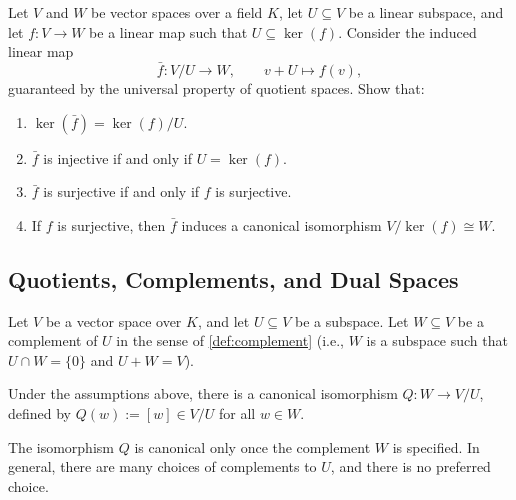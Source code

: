 \begin{exercise}
\label{exc:properties_induced_quotient_maps}
Let $V$ and $W$ be vector spaces over a field $K$, let $U \subseteq V$ be a linear subspace, and let $f \colon V \to W$ be a linear map such that $U \subseteq \ker(f)$. Consider the induced linear map
\[
\bar{f} \colon V/U \longrightarrow W, \qquad v + U \longmapsto f(v),
\]
guaranteed by the universal property of quotient spaces. Show that:
\begin{enumerate}
    \item $\ker(\bar{f}) = \ker(f)/U$.
    \item $\bar{f}$ is injective if and only if $U = \ker(f)$.
    \item $\bar{f}$ is surjective if and only if $f$ is surjective.
    \item If $f$ is surjective, then $\bar{f}$ induces a canonical isomorphism $V/\ker(f) \cong W$.
\end{enumerate}
\end{exercise}

\subsection{Quotients, Complements, and Dual Spaces}

Let $V$ be a vector space over $K$, and let $U \subseteq V$ be a subspace. Let $W \subseteq V$ be a complement of $U$ in the sense of \cref{def:complement} (i.e., $W$ is a subspace such that $U \cap W = \{0\}$ and $U + W = V$).

\begin{proposition}
  \label{prop:iso_complement}
  Under the assumptions above, there is a canonical isomorphism $Q \colon W \to V/U$, defined by $Q(w) := [w] \in V/U$ for all $w \in W$.
\end{proposition}

\begin{remark}
  The isomorphism $Q$ is canonical only once the complement $W$ is specified. In general, there are many choices of complements to $U$, and there is no preferred choice.
\end{remark}

